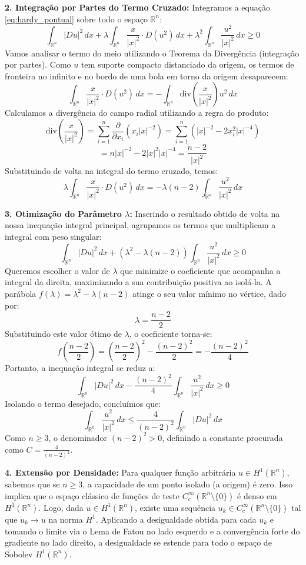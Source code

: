 \documentclass[cs_edp_2026.1.tex]{subfiles} %
\begin{document}
{	\textbf{2. Integração por Partes do Termo Cruzado:}
	Integramos a equação \eqref{eq:hardy_pontual} sobre todo o espaço $\mathbb{R}^n$:
	$$
	\int_{\mathbb{R}^n} |Du|^2 \, dx + \lambda \int_{\mathbb{R}^n} \frac{x}{|x|^2} \cdot D(u^2) \, dx + \lambda^2 \int_{\mathbb{R}^n} \frac{u^2}{|x|^2} \, dx \geq 0
	$$
	Vamos analisar o termo do meio utilizando o Teorema da Divergência (integração por partes). Como $u$ tem suporte compacto distanciado da origem, os termos de fronteira no infinito e no bordo de uma bola em torno da origem desaparecem:
	$$
	\int_{\mathbb{R}^n} \frac{x}{|x|^2} \cdot D(u^2) \, dx = - \int_{\mathbb{R}^n} \text{div}\left( \frac{x}{|x|^2} \right) u^2 \, dx
	$$
	Calculamos a divergência do campo radial utilizando a regra do produto:
	$$
	\text{div}\left( \frac{x}{|x|^2} \right) = \sum_{i=1}^n \frac{\partial}{\partial x_i} (x_i |x|^{-2}) = \sum_{i=1}^n \left( |x|^{-2} - 2x_i^2 |x|^{-4} \right)
	$$
	$$
	= n|x|^{-2} - 2|x|^2|x|^{-4} = \frac{n-2}{|x|^2}
	$$
	Substituindo de volta na integral do termo cruzado, temos:
	$$
	\lambda \int_{\mathbb{R}^n} \frac{x}{|x|^2} \cdot D(u^2) \, dx = -\lambda(n-2) \int_{\mathbb{R}^n} \frac{u^2}{|x|^2} \, dx
	$$
	
	\textbf{3. Otimização do Parâmetro $\lambda$:}
	Inserindo o resultado obtido de volta na nossa inequação integral principal, agrupamos os termos que multiplicam a integral com peso singular:
	$$
	\int_{\mathbb{R}^n} |Du|^2 \, dx + \left( \lambda^2 - \lambda(n-2) \right) \int_{\mathbb{R}^n} \frac{u^2}{|x|^2} \, dx \geq 0
	$$
	Queremos escolher o valor de $\lambda$ que minimize o coeficiente que acompanha a integral da direita, maximizando a sua contribuição positiva ao isolá-la. A parábola $f(\lambda) = \lambda^2 - \lambda(n-2)$ atinge o seu valor mínimo no vértice, dado por:
	$$
	\lambda = \frac{n-2}{2}
	$$
	Substituindo este valor ótimo de $\lambda$, o coeficiente torna-se:
	$$
	f\left(\frac{n-2}{2}\right) = \left(\frac{n-2}{2}\right)^2 - \frac{(n-2)^2}{2} = -\frac{(n-2)^2}{4}
	$$
	Portanto, a inequação integral se reduz a:
	$$
	\int_{\mathbb{R}^n} |Du|^2 \, dx - \frac{(n-2)^2}{4} \int_{\mathbb{R}^n} \frac{u^2}{|x|^2} \, dx \geq 0
	$$
	Isolando o termo desejado, concluímos que:
	$$
	\int_{\mathbb{R}^n} \frac{u^2}{|x|^2} \, dx \leq \frac{4}{(n-2)^2} \int_{\mathbb{R}^n} |Du|^2 \, dx
	$$
	Como $n \geq 3$, o denominador $(n-2)^2 > 0$, definindo a constante procurada como $\boxed{C = \frac{4}{(n-2)^2}}$.
	
	\textbf{4. Extensão por Densidade:}
	Para qualquer função arbitrária $u \in H^1(\mathbb{R}^n)$, sabemos que se $n \geq 3$, a capacidade de um ponto isolado (a origem) é zero. Isso implica que o espaço clássico de funções de teste $C_c^\infty(\mathbb{R}^n \setminus \{0\})$ é denso em $H^1(\mathbb{R}^n)$. Logo, dada $u \in H^1(\mathbb{R}^n)$, existe uma sequência $u_k \in C_c^\infty(\mathbb{R}^n \setminus \{0\})$ tal que $u_k \to u$ na norma $H^1$. Aplicando a desigualdade obtida para cada $u_k$ e tomando o limite via o Lema de Fatou no lado esquerdo e a convergência forte do gradiente no lado direito, a desigualdade se estende para todo o espaço de Sobolev $H^1(\mathbb{R}^n)$.
}
\end{document}
